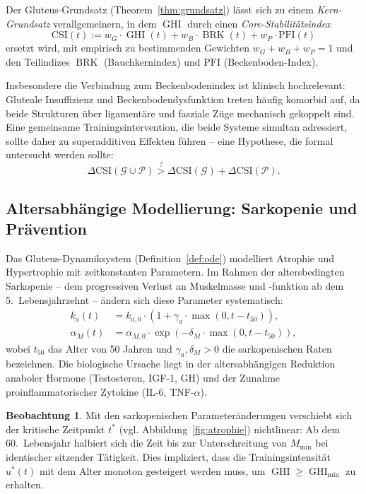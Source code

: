 ﻿\documentclass[12pt,a4paper]{report}
\theoremstyle{plain}
\theoremstyle{definition}
\newtheorem{beobachtung}[theorem]{Beobachtung}
\theoremstyle{remark}
\DeclareMathOperator{\GHI}{GHI}
\DeclareMathOperator{\BRK}{BRK}
\begin{document}
	Der Gluteus-Grundsatz (Theorem~\ref{thm:grundsatz}) lässt sich zu einem
	\emph{Kern-Grundsatz} verallgemeinern, in dem $\GHI$ durch einen
	\emph{Core-Stabilitätsindex}
	\[
	\mathrm{CSI}(t) := w_G \cdot \GHI(t) + w_B \cdot \BRK(t) + w_P \cdot \mathrm{PFI}(t)
	\]
	ersetzt wird, mit empirisch zu bestimmenden Gewichten $w_G + w_B + w_P = 1$
	und den Teilindizes $\BRK$ (Bauchkernindex) und $\mathrm{PFI}$ (Beckenboden-Index).
	
	Insbesondere die Verbindung zum Beckenbodenindex ist klinisch hochrelevant:
	Gluteale Insuffizienz und Beckenbodendysfunktion treten häufig komorbid auf,
	da beide Strukturen über ligamentäre und fasziale Züge mechanisch gekoppelt sind.
	Eine gemeinsame Trainingsintervention, die beide Systeme simultan adressiert,
	sollte daher zu superadditiven Effekten führen -- eine Hypothese, die formal
	untersucht werden sollte:
	\[
	\Delta \mathrm{CSI}(\mathcal{G} \cup \mathcal{P}) \stackrel{?}{>}
	\Delta \mathrm{CSI}(\mathcal{G}) + \Delta \mathrm{CSI}(\mathcal{P}).
	\]
	
	\subsection{Altersabhängige Modellierung: Sarkopenie und Prävention}
	\label{subsec:sarkopenie}
	
	Das Gluteus-Dynamiksystem (Definition~\ref{def:ode}) modelliert Atrophie
	und Hypertrophie mit zeitkonstanten Parametern. Im Rahmen der
	altersbedingten Sarkopenie -- dem progressiven Verlust an Muskelmasse
	und -funktion ab dem 5.~Lebensjahrzehnt -- ändern sich diese Parameter
	systematisch:
	\begin{align*}
		k_a(t) &= k_{a,0} \cdot \left(1 + \gamma_a \cdot \max(0, t - t_{50})\right), \\
		\alpha_M(t) &= \alpha_{M,0} \cdot \exp\!\left(-\delta_M \cdot \max(0, t - t_{50})\right),
	\end{align*}
	wobei $t_{50}$ das Alter von 50 Jahren und $\gamma_a, \delta_M > 0$
	die sarkopenischen Raten bezeichnen. Die biologische Ursache liegt in
	der altersabhängigen Reduktion anaboler Hormone (Testosteron, IGF-1, GH)
	und der Zunahme proinflammatorischer Zytokine (IL-6, TNF-$\alpha$).
	
	\begin{beobachtung}
		Mit den sarkopenischen Parameteränderungen verschiebt sich der kritische
		Zeitpunkt $t^*$ (vgl. Abbildung~\ref{fig:atrophie}) nichtlinear:
		Ab dem 60.~Lebensjahr halbiert sich die Zeit bis zur Unterschreitung
		von $M_{\min}$ bei identischer sitzender Tätigkeit. Dies impliziert,
		dass die Trainingsintensität $u^*(t)$ mit dem Alter monoton gesteigert
		werden muss, um $\GHI \geq \GHI_{\min}$ zu erhalten.
	\end{beobachtung}
	
\end{document}
